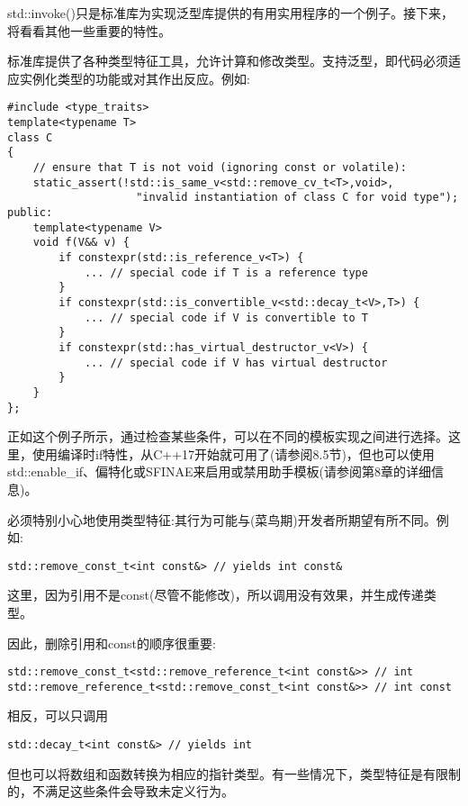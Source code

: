 
std::invoke()只是标准库为实现泛型库提供的有用实用程序的一个例子。接下来，将看看其他一些重要的特性。


标准库提供了各种类型特征工具，允许计算和修改类型。支持泛型，即代码必须适应实例化类型的功能或对其作出反应。例如:

\begin{lstlisting}[style=styleCXX]
#include <type_traits>
template<typename T>
class C
{
	// ensure that T is not void (ignoring const or volatile):
	static_assert(!std::is_same_v<std::remove_cv_t<T>,void>,
					"invalid instantiation of class C for void type");
public:
	template<typename V>
	void f(V&& v) {
		if constexpr(std::is_reference_v<T>) {
			... // special code if T is a reference type
		}
		if constexpr(std::is_convertible_v<std::decay_t<V>,T>) {
			... // special code if V is convertible to T
		}
		if constexpr(std::has_virtual_destructor_v<V>) {
			... // special code if V has virtual destructor
		}
	}
};
\end{lstlisting}

正如这个例子所示，通过检查某些条件，可以在不同的模板实现之间进行选择。这里，使用编译时if特性，从C++17开始就可用了(请参阅8.5节)，但也可以使用std::enable\_if、偏特化或SFINAE来启用或禁用助手模板(请参阅第8章的详细信息)。

必须特别小心地使用类型特征:其行为可能与(菜鸟期)开发者所期望有所不同。例如:

\begin{lstlisting}[style=styleCXX]
std::remove_const_t<int const&> // yields int const&
\end{lstlisting}

这里，因为引用不是const(尽管不能修改)，所以调用没有效果，并生成传递类型。

因此，删除引用和const的顺序很重要:

\begin{lstlisting}[style=styleCXX]
std::remove_const_t<std::remove_reference_t<int const&>> // int
std::remove_reference_t<std::remove_const_t<int const&>> // int const
\end{lstlisting}

相反，可以只调用

\begin{lstlisting}[style=styleCXX]
std::decay_t<int const&> // yields int
\end{lstlisting}

但也可以将数组和函数转换为相应的指针类型。有一些情况下，类型特征是有限制的，不满足这些条件会导致未定义行为。


